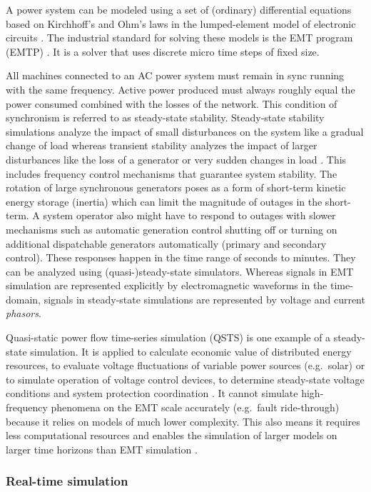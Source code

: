\documentclass[a4paper]{atseminar}
\begin{document}
A power system can be modeled using a set of (ordinary) differential equations based on Kirchhoff's and Ohm's laws in the lumped-element model of electronic circuits \cite{watson2003}.
The industrial standard for solving these models is the EMT program (EMTP) \cite{dommel1964}. It is a solver that uses discrete micro time steps of fixed size. 

All machines connected to an AC power system must remain in sync running with the same frequency. Active power produced must always roughly equal the power consumed combined with the losses of the network. This condition of synchronism is referred to as steady-state stability. Steady-state stability simulations analyze the impact of small disturbances on the system like a gradual change of load whereas transient stability analyzes the impact of larger disturbances like the loss of a generator or very sudden changes in load \cite{sauer1998}.
This includes frequency control mechanisms that guarantee system stability. The rotation of large synchronous generators poses as a form of short-term kinetic energy storage (inertia) which can limit the magnitude of outages in the short-term. A system operator also might have to respond to outages with slower mechanisms such as automatic generation control shutting off or turning on additional dispatchable generators automatically (primary and secondary control). These responses happen in the time range of seconds to minutes. They can be analyzed using (quasi-)steady-state simulators. 
Whereas signals in EMT simulation are represented explicitly by electromagnetic waveforms in the time-domain, signals in steady-state simulations are represented by voltage and current \textit{phasors}.

Quasi-static power flow time-series simulation (QSTS) is one example of a steady-state simulation. It is applied to calculate economic value of distributed energy resources, to evaluate voltage fluctuations of variable power sources (e.g.~solar) \cite{ieee1547.7} or to simulate operation of voltage control devices, to determine steady-state voltage conditions and system protection coordination \cite{broderick2013}.
It cannot simulate high-frequency phenomena on the EMT scale accurately (e.g.~fault ride-through) because it relies on models of much lower complexity. This also means it requires less computational resources and enables the simulation of larger models on larger time horizons than EMT simulation \cite{lundstrom2017}.

\subsubsection{Real-time simulation}
\label{MH:sec:bg:real-time}
\end{document}
